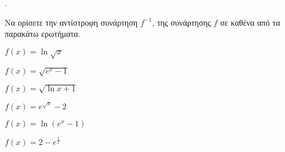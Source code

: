 \documentclass[11pt,a4paper,twocolumn]{article}
\newcounter{askhsh}
\newcommand{\askhsh}{\large\theaskhsh.\ \addtocounter{askhsh}{1}}
\begin{document}
\askhsh Να ορίσετε την αντίστροφη συνάρτηση $f^{-1}$, της συνάρτησης $f$ σε καθένα από τα παρακάτω ερωτήματα.
\begin{alist}
\begin{multicols}{2}
\item $f(x)=\ln{\sqrt{x}}$
\item $f(x)=\sqrt{e^x-1}$
\item $f(x)=\sqrt{\ln{x}+1}$
\item $f(x)=e^{\sqrt{x}}-2$
\item $f(x)=\ln{\left(e^x-1\right)}$
\item $f(x)=2-e^{\frac{1}{x}}$
\end{multicols}
\end{alist}
\end{document}

